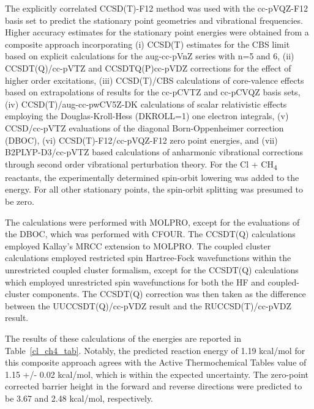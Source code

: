 \documentclass[journal=jpcafh,manuscript=article]{achemso}
\begin{document}
The explicitly correlated CCSD(T)-F12 method\cite{adler07,knizia09} was used with the
cc-pVQZ-F12 basis set\cite{peterson08} to predict the stationary point geometries and
vibrational frequencies. Higher accuracy estimates for the stationary
point energies were obtained from a composite approach incorporating (i)
CCSD(T) estimates for the CBS limit based on explicit calculations for
the aug-cc-pVnZ series with n=5 and 6,\cite{dunning89} (ii) CCSDT(Q)/cc-pVTZ and
CCSDTQ(P)cc-pVDZ corrections for the effect of higher order excitations,
(iii) CCSD(T)/CBS calculations of core-valence effects based on
extrapolations of results for the cc-pCVTZ and cc-pCVQZ basis sets, (iv)
CCSD(T)/aug-cc-pwCV5Z-DK calculations of scalar relativistic effects
employing the Douglas-Kroll-Hess (DKROLL=1) one electron integrals,\cite{peng12} (v)
CCSD/cc-pVTZ evaluations of the diagonal Born-Oppenheimer correction
(DBOC), (vi) CCSD(T)-F12/cc-pVQZ-F12 zero point energies, and (vii)
B2PLYP-D3/cc-pVTZ\cite{grimme10} based calculations of anharmonic vibrational
corrections through second order vibrational perturbation theory. For
the Cl + CH\textsubscript{4} reactants, the experimentally determined
spin-orbit lowering was added to the energy. For all other stationary
points, the spin-orbit splitting was presumed to be zero.

The calculations were performed with MOLPRO,\cite{molpro15,werner12}
except for the evaluations of the DBOC, which was performed with
CFOUR.\cite{cfour} The CCSDT(Q) calculations employed Kallay's MRCC
extension to MOLPRO.\cite{mrcc,kallay01} The coupled cluster
calculations employed restricted spin Hartree-Fock wavefunctions
within the unrestricted coupled cluster formalism, except for the
CCSDT(Q) calculations which employed unrestricted spin
wavefunctions for both the HF and coupled-cluster components. The
CCSDT(Q) correction was then taken as the difference between the
UUCCSDT(Q)/cc-pVDZ result and the RUCCSD(T)/cc-pVDZ result.

 The results of these calculations of the energies are reported in
Table~\ref{cl_ch4_tab}. Notably, the predicted reaction energy of
1.19 kcal/mol for this composite approach agrees with the Active
Thermochemical Tables value of 1.15 +/- 0.02 kcal/mol,\cite{atct}
which is within the expected uncertainty. The zero-point corrected
barrier height in the forward and reverse directions were predicted to
be 3.67 and 2.48 kcal/mol, respectively.
\end{document}
